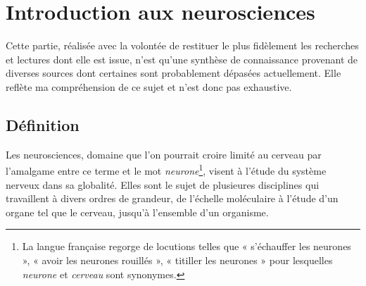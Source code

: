 \documentclass[12pt,fleqn,oneside,openany]{book} %
\begin{document}
\section{Introduction aux neurosciences} \label{sec:introNeuro}
\begin{remark}
	Cette partie, réalisée avec la volontée de restituer le plus fidèlement les recherches et lectures dont elle est issue, n'est qu'une synthèse de connaissance provenant de diverses sources dont certaines sont probablement dépasées actuellement. Elle reflète ma compréhension de ce sujet et n'est donc pas exhaustive.
\end{remark}

\subsection[Définition]{Définition \cite{wikineuro}} \label{ssec:definition} %
Les neurosciences, domaine que l'on pourrait croire limité au cerveau par l'amalgame entre ce terme et le mot \emph{neurone}\footnote{La langue française regorge de locutions telles que « s'échauffer les neurones », « avoir les neurones rouillés », « titiller les neurones » pour lesquelles \emph{neurone} et \emph{cerveau} sont synonymes.}, visent à l'étude du système nerveux dans sa globalité. Elles sont le sujet de plusieures disciplines qui travaillent à divers ordres de grandeur, de l'échelle moléculaire à l'étude d'un organe tel que le cerveau, jusqu'à l'ensemble d'un organisme. 

\begin{figure}[h]
\end{figure}
\end{document}
